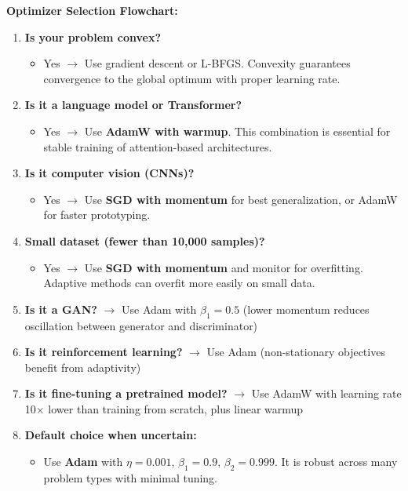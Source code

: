 \documentclass[../../editions/book2-optimization/main.tex]{subfiles}
\begin{document}
\begin{keyconcept}
\textbf{Optimizer Selection Flowchart:}
\begin{enumerate}
    \item \textbf{Is your problem convex?}
    \begin{itemize}
        \item Yes $\rightarrow$ Use gradient descent or L-BFGS. Convexity guarantees convergence to the global optimum with proper learning rate.
    \end{itemize}
    \item \textbf{Is it a language model or Transformer?}
    \begin{itemize}
        \item Yes $\rightarrow$ Use \textbf{AdamW with warmup}. This combination is essential for stable training of attention-based architectures.
    \end{itemize}
    \item \textbf{Is it computer vision (CNNs)?}
    \begin{itemize}
        \item Yes $\rightarrow$ Use \textbf{SGD with momentum} for best generalization, or AdamW for faster prototyping.
    \end{itemize}
    \item \textbf{Small dataset (fewer than 10,000 samples)?}
    \begin{itemize}
        \item Yes $\rightarrow$ Use \textbf{SGD with momentum} and monitor for overfitting. Adaptive methods can overfit more easily on small data.
    \end{itemize}
    \item \textbf{Is it a GAN?} $\rightarrow$ Use Adam with $\beta_1=0.5$ (lower momentum reduces oscillation between generator and discriminator)
    \item \textbf{Is it reinforcement learning?} $\rightarrow$ Use Adam (non-stationary objectives benefit from adaptivity)
    \item \textbf{Is it fine-tuning a pretrained model?} $\rightarrow$ Use AdamW with learning rate 10$\times$ lower than training from scratch, plus linear warmup
    \item \textbf{Default choice when uncertain:}
    \begin{itemize}
        \item Use \textbf{Adam} with $\eta = 0.001$, $\beta_1 = 0.9$, $\beta_2 = 0.999$. It is robust across many problem types with minimal tuning.
    \end{itemize}
\end{enumerate}
\end{keyconcept}
\end{document}
